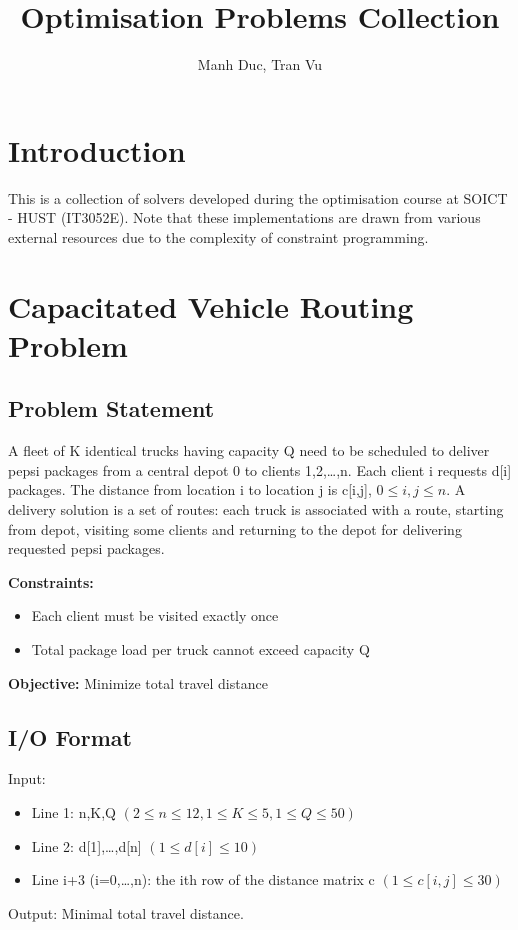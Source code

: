 \documentclass{article}
\newcommand{\subtitle}[1]{%
  \posttitle{%
    \par\end{center}
    \begin{center}\large#1\end{center}}%
}
\begin{document}
\title{Optimisation Problems Collection}
\subtitle{SOICT - HUST (IT3052E)}
\author{Manh Duc, Tran Vu}
\date{}
\maketitle
\pagebreak
\tableofcontents
\pagebreak
\section{Introduction}
This is a collection of solvers developed during the optimisation course at SOICT - HUST (IT3052E). Note that these implementations are drawn from various external resources due to the complexity of constraint programming.

\pagebreak

\section{Capacitated Vehicle Routing Problem}

\subsection{Problem Statement}
A fleet of K identical trucks having capacity Q need to be scheduled to deliver pepsi packages from a central depot 0 to clients 1,2,…,n. Each client i requests d[i] packages. The distance from location i to location j is c[i,j], $0 \leq i,j \leq n$. A delivery solution is a set of routes: each truck is associated with a route, starting from depot, visiting some clients and returning to the depot for delivering requested pepsi packages.

\textbf{Constraints:}

\begin{itemize}
    \item Each client must be visited exactly once
    \item Total package load per truck cannot exceed capacity Q
\end{itemize}

\textbf{Objective:} Minimize total travel distance

\subsection{I/O Format}
Input:
\begin{itemize}
    \item Line 1: n,K,Q $(2\le n\le 12,1\le K\le 5,1\le Q\le50)$
    \item Line 2: d[1],\dots,d[n] $(1\le d[i]\le 10)$
    \item Line i+3 (i=0,…,n): the ith row of the distance matrix c $(1\le c[i,j]\le 30)$
\end{itemize}
Output: Minimal total travel distance.
\end{document}
